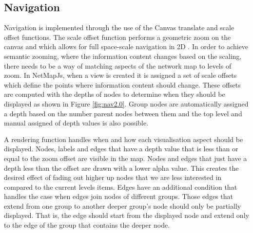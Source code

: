 \documentclass[11pt, a4paper]{article}
\begin{document}
\subsection{Navigation}
\label{sec:navigation.impl}

Navigation is implemented through the use of the Canvas translate and scale
offset functions. The scale offset function performs a geometric zoom on the
canvas and which allows for full space-scale navigation in 2D
\cite{Furnas_1995}. In order to achieve semantic zooming, where the information
content changes based on the scaling, there needs to be a way of matching
aspects of the network map to levels of zoom. In NetMapJs, when a view is
created it is assigned a set of scale offsets which define the points where
information content should change. These offsets are computed with the depths of
nodes to determine when they should be displayed as shown in Figure
\ref{fig:nav2.0}. Group nodes are automatically assigned a depth based on the
number parent nodes between them and the top level and manual assigned of depth
values is also possible. 

A rendering function handles when and how each visualisation aspect should be
displayed. Nodes, labels and edges that have a depth value that is less than or
equal to the zoom offset are visible in the map. Nodes and edges that just have
a depth less than the offset are drawn with a lower alpha value. This creates
the desired effect of fading out higher up nodes that we are less interested in
compared to the current levels items. Edges have an additional condition that
handles the case when edges join nodes of different groups. Those edges that
extend from one group to another deeper group's node should only be partially
displayed. That is, the edge should start from the displayed node and extend
only to the edge of the group that contains the deeper node.
\end{document}
